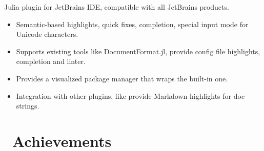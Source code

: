 \documentclass{resume}
\begin{document}
Julia plugin for JetBrains IDE, compatible with all JetBrains products.
\begin{itemize}
  \item Semantic-based highlights, quick fixes, completion, special input mode for Unicode characters.
  \item Supports existing tools like DocumentFormat.jl, provide config file highlights, completion and linter.
  \item Provides a visualized package manager that wraps the built-in one.
  \item Integration with other plugins, like provide Markdown highlights for doc strings.
\end{itemize}


\section{\faHeartO\ Achievements}
\end{document}
